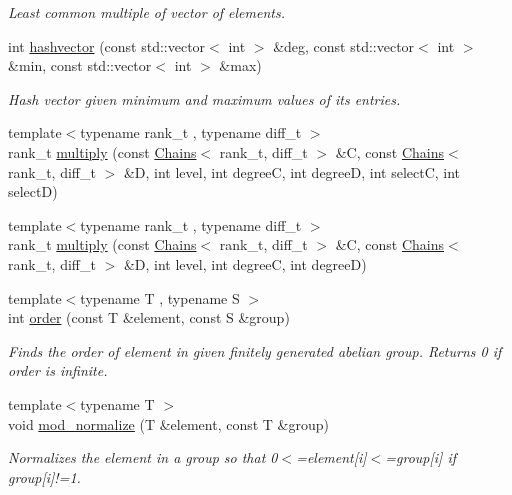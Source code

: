 \begin{DoxyCompactItemize}
\begin{DoxyCompactList}\small\item\em Least common multiple of vector of elements. \end{DoxyCompactList}\item 
int \hyperlink{namespaceMackey_ae57418329a761aa68d26d68b637fe9dd}{hashvector} (const std\+::vector$<$ int $>$ \&deg, const std\+::vector$<$ int $>$ \&min, const std\+::vector$<$ int $>$ \&max)
\begin{DoxyCompactList}\small\item\em Hash vector given minimum and maximum values of its entries. \end{DoxyCompactList}\item 
{\footnotesize template$<$typename rank\+\_\+t , typename diff\+\_\+t $>$ }\\rank\+\_\+t \hyperlink{namespaceMackey_a80dbde3a859378ede596b48869ec50d9}{multiply} (const \hyperlink{classMackey_1_1Chains}{Chains}$<$ rank\+\_\+t, diff\+\_\+t $>$ \&C, const \hyperlink{classMackey_1_1Chains}{Chains}$<$ rank\+\_\+t, diff\+\_\+t $>$ \&D, int level, int degreeC, int degreeD, int selectC, int selectD)
\item 
{\footnotesize template$<$typename rank\+\_\+t , typename diff\+\_\+t $>$ }\\rank\+\_\+t \hyperlink{namespaceMackey_a2eca4cc709501ad3fc20b82fe4bcbd33}{multiply} (const \hyperlink{classMackey_1_1Chains}{Chains}$<$ rank\+\_\+t, diff\+\_\+t $>$ \&C, const \hyperlink{classMackey_1_1Chains}{Chains}$<$ rank\+\_\+t, diff\+\_\+t $>$ \&D, int level, int degreeC, int degreeD)
\item 
{\footnotesize template$<$typename T , typename S $>$ }\\int \hyperlink{namespaceMackey_a4abdca157edcf425b1e7ceff39d74c2f}{order} (const T \&element, const S \&group)
\begin{DoxyCompactList}\small\item\em Finds the order of element in given finitely generated abelian group. Returns 0 if order is infinite. \end{DoxyCompactList}\item 
{\footnotesize template$<$typename T $>$ }\\void \hyperlink{namespaceMackey_a257bcf5aabab2d73fdb13a23cb975d93}{mod\+\_\+normalize} (T \&element, const T \&group)
\begin{DoxyCompactList}\small\item\em Normalizes the element in a group so that 0$<$=element\mbox{[}i\mbox{]}$<$=group\mbox{[}i\mbox{]} if group\mbox{[}i\mbox{]}!=1. \end{DoxyCompactList}\item 

\end{DoxyCompactItemize}

